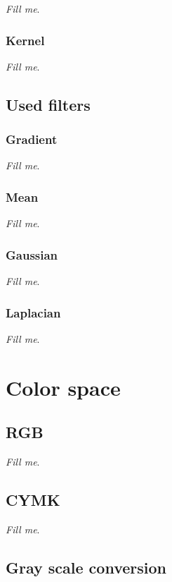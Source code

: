 \documentclass{report}
\begin{document}
			\textit{Fill me}.

		\subsubsection{Kernel}

			\textit{Fill me}.

	\subsection{Used filters}
		
		\subsubsection{Gradient}

			\textit{Fill me}.
		
		\subsubsection{Mean}

			\textit{Fill me}.

		\subsubsection{Gaussian}

			\textit{Fill me}.

		\subsubsection{Laplacian}

			\textit{Fill me}.

\section{Color space}          

	\subsection{RGB}
		
		\textit{Fill me}.

	\subsection{CYMK}

		\textit{Fill me}.

	\subsection{Gray scale conversion}
\end{document}
